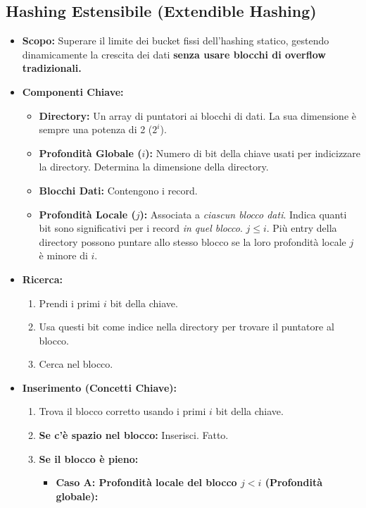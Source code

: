 \subsection{Hashing Estensibile (Extendible Hashing)}
\begin{itemize}
    \item \textbf{Scopo:} Superare il limite dei bucket fissi dell'hashing statico, gestendo dinamicamente la crescita dei dati \textbf{senza usare blocchi di overflow tradizionali.}
    \item \textbf{Componenti Chiave:}
    \begin{itemize}
        \item \textbf{Directory:} Un array di puntatori ai blocchi di dati. La sua dimensione è sempre una potenza di 2 ($2^i$).
        \item \textbf{Profondità Globale ($i$):} Numero di bit della chiave usati per indicizzare la directory. Determina la dimensione della directory.
        \item \textbf{Blocchi Dati:} Contengono i record.
        \item \textbf{Profondità Locale ($j$):} Associata a \textit{ciascun blocco dati}. Indica quanti bit sono significativi per i record \textit{in quel blocco}. $j \le i$. Più entry della directory possono puntare allo stesso blocco se la loro profondità locale $j$ è minore di $i$.
    \end{itemize}
    \item \textbf{Ricerca:}
    \begin{enumerate}
        \item Prendi i primi $i$ bit della chiave.
        \item Usa questi bit come indice nella directory per trovare il puntatore al blocco.
        \item Cerca nel blocco.
    \end{enumerate}
    \item \textbf{Inserimento (Concetti Chiave):}
    \begin{enumerate}
        \item Trova il blocco corretto usando i primi $i$ bit della chiave.
        \item \textbf{Se c'è spazio nel blocco:} Inserisci. Fatto.
        \item \textbf{Se il blocco è pieno:}
        \begin{itemize}
            \item \textbf{Caso A: Profondità locale del blocco $j < i$ (Profondità globale):}

\end{itemize}
\end{enumerate}
\end{itemize}
